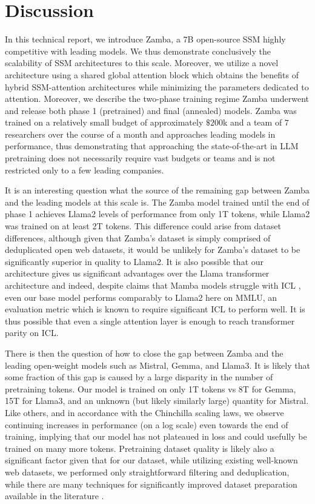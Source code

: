 \section{Discussion}

In this technical report, we introduce Zamba, a 7B open-source SSM highly competitive with leading models. We thus demonstrate conclusively the scalability of SSM architectures to this scale. Moreover, we utilize a novel architecture using a shared global attention block which obtains the benefits of hybrid SSM-attention architectures while minimizing the parameters dedicated to attention. Moreover, we describe the two-phase training regime Zamba underwent and release both phase 1 (pretrained) and final (annealed) models. Zamba was trained on a relatively small budget of approximately $\$200$k and a team of $7$ researchers over the course of a month and approaches leading models in performance, thus demonstrating that approaching the state-of-the-art in LLM pretraining does not necessarily require vast budgets or teams and is not restricted only to a few leading companies.

It is an interesting question what the source of the remaining gap between Zamba and the leading models at this scale is. The Zamba model trained until the end of phase 1 achieves Llama2 levels of performance from only 1T tokens, while Llama2 was trained on at least 2T tokens. This difference could arise from dataset differences, although given that Zamba's dataset is simply comprised of deduplicated open web datasets, it would be unlikely for Zamba's dataset to be significantly superior in quality to Llama2. It is also possible that our architecture gives us significant advantages over the Llama transformer architecture and indeed, despite claims that Mamba models struggle with ICL \citep{park2024mamba}, even our base model performs comparably to Llama2 here on MMLU, an evaluation metric which is known to require significant ICL to perform well. It is thus possible that even a single attention layer is enough to reach transformer parity on ICL. 

There is then the question of how to close the gap between Zamba and the leading open-weight models such as Mistral, Gemma, and Llama3. It is likely that some fraction of this gap is caused by a large disparity in the number of pretraining tokens. Our model is trained on only 1T tokens vs 8T for Gemma, 15T for Llama3, and an unknown (but likely similarly large) quantity for Mistral. Like others, and in accordance with the Chinchilla scaling laws, we observe continuing increases in performance (on a log scale) even towards the end of training, implying that our model has not plateaued in loss and could usefully be trained on many more tokens. Pretraining dataset quality is likely also a significant factor given that for our dataset, while utilizing existing well-known web datasets, we performed only straightforward filtering and deduplication, while there are many techniques for significantly improved dataset preparation available in the literature \citep{xie2024doremi,tirumala2024d4,maini2024rephrasing}. 

